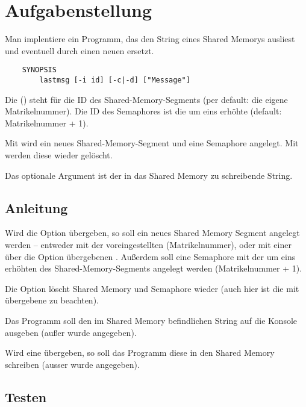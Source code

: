 




\section*{Aufgabenstellung}

Man implentiere ein Programm, das den String eines Shared Memorys ausliest und
eventuell durch einen neuen ersetzt.

\begin{verbatim}
    SYNOPSIS
        lastmsg [-i id] [-c|-d] ["Message"]
\end{verbatim}

Die  () steht für die ID des Shared-Memory-Segments (per
default: die eigene Matrikelnummer). Die ID des Semaphores ist die um eins
erhöhte (default: Matrikelnummer + 1).

Mit  wird ein neues Shared-Memory-Segment und eine Semaphore
angelegt. Mit  werden diese wieder gelöscht.

Das optionale Argument  ist der in das Shared
Memory zu schreibende String.

\subsection*{Anleitung}

Wird die Option  übergeben, so soll ein neues Shared Memory Segment
angelegt werden -- entweder mit der voreingestellten 
(Matrikelnummer), oder mit einer über die Option  übergebenen
. Außerdem soll eine Semaphore mit der um eins erhöhten 
des Shared-Memory-Segments angelegt werden (Matrikelnummer + 1).

Die Option  löscht Shared Memory und Semaphore wieder (auch hier ist
die mit  übergebene  zu beachten).

Das Programm soll den im Shared Memory befindlichen String auf die Konsole
ausgeben (außer  wurde angegeben).

Wird eine  übergeben, so soll das Programm diese
in den Shared Memory schreiben (ausser  wurde angegeben).

\subsection*{Testen}

